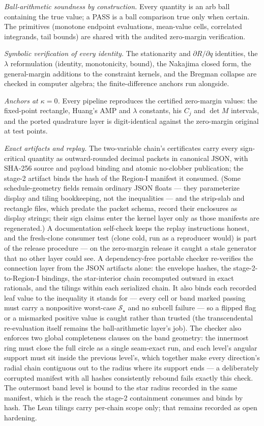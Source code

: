 \documentclass[11pt]{article}
\theoremstyle{remark}
\newcommand{\sS}{\mathcal{S}}
\begin{document}
\emph{Ball-arithmetic soundness by construction.}  Every quantity is
an arb ball containing the true value; a PASS is a ball comparison
true only when certain.  The primitives (monotone endpoint
evaluations, mean-value cells, correlated integrands, tail bounds)
are shared with the audited zero-margin verification.

\emph{Symbolic verification of every identity.}  The stationarity
and $\partial R/\partial q$ identities, the $\lambda$ reformulation
(identity, monotonicity, bound), the Nakajima closed form, the
general-margin additions to the constraint kernels, and the Bregman
collapse are checked in computer algebra; the finite-difference
anchors run alongside.

\emph{Anchors at $\kappa=0$.}  Every pipeline reproduces the
certified zero-margin values: the fixed-point rectangle, Huang's
AMP and $\lambda$ constants, his $C_j$ and $\det M$ intervals, and
the ported quadrature layer is digit-identical against the
zero-margin original at test points.

\emph{Exact artifacts and replay.}  The two-variable chain's
certificates carry every
sign-critical quantity as outward-rounded decimal packets in
canonical JSON, with SHA-256 source and payload binding and atomic
no-clobber publication; the stage-2 artifact binds the hash of the
Region-I manifest it consumed.  (Some schedule-geometry fields
remain ordinary JSON floats --- they parameterize display and tiling
bookkeeping, not the inequalities --- and the strip-slab and
rectangle files, which predate the packet schema, record their
enclosures as display strings; their sign claims enter the kernel
layer only as those manifests are regenerated.)  A
documentation self-check keeps the replay instructions honest, and
the fresh-clone consumer test (clone cold, run as a reproducer
would) is part of the release procedure --- on the zero-margin
release it caught a stale generator that no other layer could see.
A dependency-free portable checker re-verifies the connection layer
from the JSON artifacts alone: the envelope hashes, the
stage-2-to-Region-I bindings, the star-interior chain recomputed
outward in exact rationals, and the tilings within each serialized
chain.  It also binds each recorded leaf value to the inequality it
stands for --- every cell or band marked passing must carry a
nonpositive worst-case $\sS_\star$ and no subcell failure --- so a
flipped flag or a mismarked positive value is caught rather than
trusted (the transcendental re-evaluation itself remains the
ball-arithmetic layer's job).  The checker also enforces two global
completeness clauses on
the band geometry: the innermost ring must close the full circle as
a single seam-exact run, and each level's angular support must sit
inside the previous level's, which together make every direction's
radial chain contiguous out to the radius where its support ends ---
a deliberately corrupted manifest with all hashes consistently
rebound fails exactly this check.  The outermost band level is bound
to the star radius recorded in the same manifest, which is the reach
the stage-2 containment consumes and binds by hash.  The Lean
tilings carry per-chain scope only; that remains recorded as open
hardening.
\end{document}
